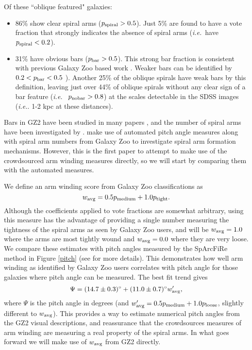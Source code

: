 \documentclass[usenatbib]{mn2e}
\newcommand{\ie}{{\it i.e.}}
\newcommand{\be}{\begin{equation}}
\newcommand{\ee}{\end{equation}}
\begin{document}
 Of these ``oblique featured" galaxies: 
\begin{itemize}
\item {86}\% show clear spiral arms ($p_{\rm spiral} > 0.5$). Just {5\%} are found to have a vote fraction that strongly indicates the absence of spiral arms (\ie ~have $p_{\rm spiral}<0.2$). 
\item {31}\% have obvious bars ($p_{\rm bar}>0.5$). This strong bar fraction is consistent with previous Galaxy Zoo based work \citep[e.g.][]{Masters2011, Masters2012}. Weaker bars can be identified by $0.2<p_{\rm bar}<0.5$ \citep[e.g.][]{Skibba2012,Willett2013,Kruk2018}). Another {25}\% of the oblique spirals have weak bars by this definition, leaving just over {44\%} of oblique spirals without any clear sign of a bar feature (\ie~ $p_{\rm no bar}>0.8$) at the scales detectable in the SDSS images (\ie. 1-2 kpc at these distances). 
\end{itemize}

Bars in GZ2 have been studied in many papers \citep[e.g.][]{Masters2011, Masters2012, Skibba2012, Cheung2013, Cheung2015, Galloway2015, Kruk2017, Kruk2018}, and the number of spiral arms have been investigated by \citep{Willett2015, Hart2016, Hart2017}. \citet{Hart2017b,Hart2018} make use of automated pitch angle measures along with spiral arm numbers from Galaxy Zoo to investigate spiral arm formation mechanisms. However, this is the first paper to attempt to make use of the crowdsourced arm winding measures directly, so we will start by comparing them with the automated measures. 

We define an arm winding score from Galaxy Zoo classifications as
\be
\label{eqn:winding}
w_{\rm avg} =  0.5p_{\rm medium} + 1.0p_{\rm tight}.
\ee
Although the coefficients applied to vote fractions are somewhat arbitrary, using this measure has the advantage of providing a single number measuring the tightness of the spiral arms as seen by Galaxy Zoo users, and will be $w_{\rm avg} = 1.0$ where the arms are most tightly wound and $w_{\rm avg} = 0.0$ where they are very loose. We compare these estimates with pitch angles measured by the SpArcFiRe method \citep{DavisHayes2014} in Figure \ref{pitch} (see \citealt{Hart2017b} for more details). This demonstrates how well arm winding as identified by Galaxy Zoo users correlates with pitch angle for those galaxies where pitch angle can be measured. The best fit trend gives 
\be
\label{eqn:pitch}
\Psi =  (14.7\pm0.3)^\circ + (11.0\pm0.7)^\circ w'_{\rm avg}, 
\ee
where $\Psi$ is the pitch angle in degrees (and $w'_{\rm avg} = 0.5p_{\rm medium} + 1.0p_{\rm loose}$, slightly different to $w_{\rm avg}$). This provides a way to estimate numerical pitch angles from the GZ2 visual descriptions, and reassurance that the crowdsources measures of arm winding are measuring a real property of the spiral arms. In what goes forward we will make use of $w_{\rm avg}$ from GZ2 directly.  
\end{document}
